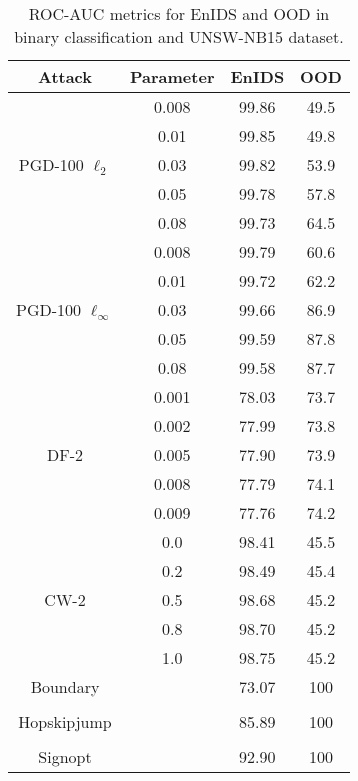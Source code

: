 \documentclass[conference]{IEEEtran}
\begin{document}
	\begin{table}[H]
		\caption{ROC-AUC metrics for EnIDS and OOD in binary classification and UNSW-NB15 dataset.}
		\small
		\setlength{\tabcolsep}{1pt}
		\centering
		\label{tab:unsw_bin_ood}
		
		\begin{tabular}{|c|c|c|c|}
			\hline
			\textbf{Attack} & \textbf{Parameter} & \textbf{EnIDS} & \textbf{OOD}
			\\
			\hline
			\multirow{5}{*}{PGD-100 $\ell_2$}& 0.008 & 99.86 & 49.5
			\\
			
			& 0.01 & 99.85 & 49.8
			\\
			
			& 0.03 & 99.82 & 53.9
			\\
			
			& 0.05 & 99.78 & 57.8
			\\
			
			& 0.08 & 99.73 & 64.5
			\\
			\hline
			\multirow{5}{*}{PGD-100 $\ell_\infty$}& 0.008 & 99.79 & 60.6
			\\
			
			& 0.01 & 99.72 & 62.2
			\\
			
			& 0.03 & 99.66 & 86.9
			\\
			
			& 0.05 & 99.59 & 87.8
			\\
			
			& 0.08 & 99.58 & 87.7
			\\
			\hline
			\multirow{5}{*}{DF-2}& 0.001 & 78.03 & 73.7
			\\
			
			& 0.002 & 77.99 & 73.8
			\\
			
			& 0.005 & 77.90 & 73.9
			\\
			
			& 0.008 & 77.79 & 74.1
			\\
			
			& 0.009 & 77.76 & 74.2
			\\
			\hline
			\multirow{5}{*}{CW-2}& 0.0 & 98.41 & 45.5
			\\
			
			& 0.2 & 98.49 & 45.4
			\\
			
			& 0.5 & 98.68 & 45.2
			\\
			
			& 0.8 & 98.70 & 45.2
			\\
			
			& 1.0 & 98.75 & 45.2
			\\
			\hline
			Boundary &  & 73.07 & 100
			\\
			\hline
			&  &  & 
			\\
			\hline
			Hopskipjump &  & 85.89 & 100
			\\
			\hline
			&  &  & 
			\\
			\hline
			Signopt &  & 92.90 & 100
			\\
			\hline
		\end{tabular}
	\end{table}
	
\end{document}
